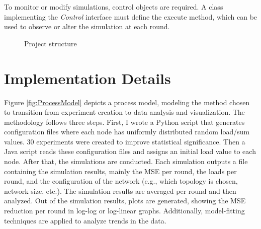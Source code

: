 To monitor or modify simulations, control objects are required. A class implementing the \textit{Control} interface must define the execute method, which can be used to observe or alter the simulation at each round. \cite{peersimdocs}

\begin{figure}
    \centering
    \caption{Project structure}
    \label{fig:uml}
\end{figure}

\section{Implementation Details}\label{sec:implementationdetails}
Figure \ref{fig:ProcessModel} depicts a process model, modeling the method chosen to transition from experiment creation to data analysis and visualization. The methodology follows three steps. First, I wrote a Python script that generates configuration files where each node has uniformly distributed random load/sum values. 30 experiments were created to improve statistical significance. Then a Java script reads these configuration files and assigns an initial load value to each node. After that, the simulations are conducted. Each simulation outputs a file containing the simulation results, mainly the MSE per round, the loads per round, and the configuration of the network (e.g., which topology is chosen, network size, etc.). The simulation results are averaged per round and then analyzed. Out of the simulation results, plots are generated, showing the MSE reduction per round in log-log or log-linear graphs. Additionally, model-fitting techniques are applied to analyze trends in the data.

